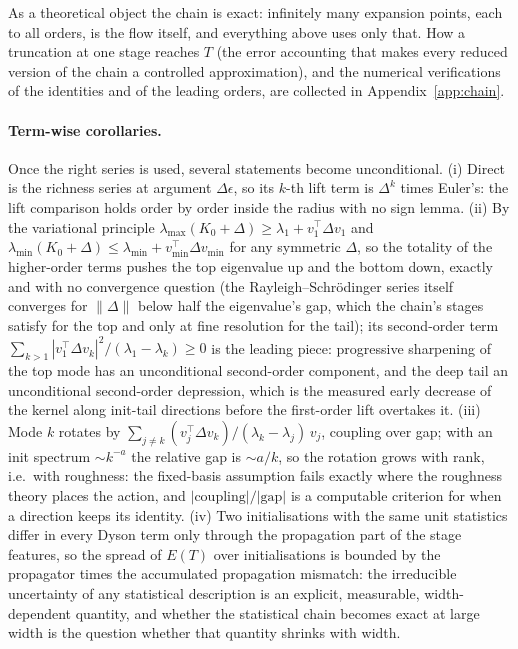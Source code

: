 As a theoretical object the chain is exact: infinitely many expansion points, each
to all orders, is the flow itself, and everything above uses only that. How a
truncation at one stage reaches $T$ (the error accounting that makes every
reduced version of the chain a controlled approximation), and the numerical
verifications of the identities and of the leading orders, are collected in
Appendix~\ref{app:chain}.

\paragraph{Term-wise corollaries.} Once the right series is used, several
statements become unconditional. (i) Direct is the richness series at argument
$\Delta\epsilon$, so its $k$-th lift term is $\Delta^k$ times Euler's: the lift
comparison holds order by order inside the radius with no sign lemma.
(ii) By the variational principle $\lambda_{\max}(K_0+\Delta)\ge\lambda_1+v_1^{\!\top}\Delta v_1$
and $\lambda_{\min}(K_0+\Delta)\le\lambda_{\min}+v_{\min}^{\!\top}\Delta v_{\min}$ for any
symmetric $\Delta$, so the totality of the higher-order terms pushes the top
eigenvalue up and the bottom down, exactly and with no convergence question
(the Rayleigh--Schr\"odinger series itself converges for $\|\Delta\|$ below half
the eigenvalue's gap, which the chain's stages satisfy for the top and only at
fine resolution for the tail); its second-order term
$\sum_{k>1}|v_1^{\!\top}\Delta v_k|^2/(\lambda_1-\lambda_k)\ge0$ is the leading piece: progressive sharpening of the
top mode has an unconditional second-order component, and the deep tail an
unconditional second-order depression, which is the measured early decrease of
the kernel along init-tail directions before the first-order lift overtakes it.
(iii) Mode $k$ rotates by $\sum_{j\ne k}(v_j^{\!\top}\Delta v_k)/(\lambda_k-\lambda_j)\,v_j$,
coupling over gap; with an init spectrum $\sim k^{-a}$ the relative gap is
$\sim a/k$, so the rotation grows with rank, i.e.\ with roughness: the
fixed-basis assumption fails exactly where the roughness theory places the
action, and $|\text{coupling}|/|\text{gap}|$ is a computable criterion for when a
direction keeps its identity. (iv) Two initialisations with the same unit
statistics differ in every Dyson term only through the propagation part of the
stage features, so the spread of $E(T)$ over initialisations is bounded by the
propagator times the accumulated propagation mismatch: the irreducible
uncertainty of any statistical description is an explicit, measurable,
width-dependent quantity, and whether the statistical chain becomes exact at
large width is the question whether that quantity shrinks with width.

